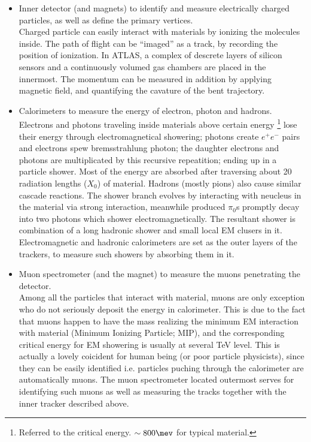 \begin{itemize}
\item Inner detector (and magnets) to identify and measure electrically charged particles, as well as define the primary vertices. \\
Charged particle can easily interact with materials by ionizing the molecules inside. The path of flight can be ``imaged'' as a track, by recording the position of ionization. 
In ATLAS, a complex of descrete layers of silicon sensors and a continuously volumed gas chambers are placed in the innermost. 
The momentum can be measured in addition by applying magnetic field, and quantifying the cavature of the bent trajectory. 

\item Calorimeters to measure the energy of electron, photon and hadrons. \\
Electrons and photons traveling inside materials above certain energy 
\footnote{Referred to the critical energy. $\sim 800 \mev$ for typical material.}
lose their energy through electromagnetical showering; photons create $e^+e^-$ pairs and electrons spew bremsstrahlung photon; 
the daughter electrons and photons are multiplicated by this recursive repeatition; ending up in a particle shower. 
Most of the energy are absorbed after traversing about 20 radiation lengths ($X_0$) of material. 
Hadrons (mostly pions) also cause similar cascade reactions. 
The shower branch evolves by interacting with neucleus in the material via strong interaction, meanwhile produced $\pi_0$s promptly decay into two photons which shower electromagnetically. 
The resultant shower is combination of a long hadronic shower and small local EM clusers in it. 
Electromagnetic and hadronic calorimeters are set as the outer layers of the trackers, to measure such showers by absorbing them in it.\\

\item Muon spectrometer (and the magnet) to measure the muons penetrating the detector. \\
Among all the particles that interact with material, muons are only exception who do not seriously deposit the energy in calorimeter. 
This is due to the fact that muons happen to have the mass realizing the minimum EM interaction with material (Minimum Ionizing Particle; MIP), 
and the corresponding critical energy for EM showering is usually at several TeV level.
This is actually a lovely coicident for human being (or poor particle physicists), 
since they can be easily identified i.e. particles puching through the calorimeter are automatically muons. The muon spectrometer located outermost serves for identifying such muons as well as measuring the tracks together with the inner tracker described above.


\end{itemize}
